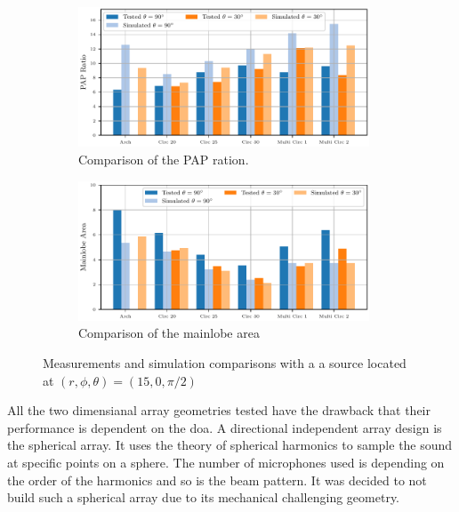 \begin{figure}[]
	\centering
	\begin{subfigure}[b]{1\textwidth}
		\centering
		\includegraphics[width=0.95\textwidth]{images/5_array_evaluation/PapTestSim.pdf}
		\caption{Comparison of the PAP ration.}
		\label{fig:comp1}
	\end{subfigure}
	\begin{subfigure}[b]{1\textwidth}
		\centering
		\includegraphics[width=0.95\textwidth]{images/5_array_evaluation/AreaTestSim.pdf}
		\caption{Comparison of the mainlobe area}
		\label{fig:comp2}
	\end{subfigure}
	\caption{Measurements and simulation comparisons with a a source located at $(r, \phi, \theta) = (15, 0, \pi/2)$}
	\label{fig:TestSim}
\end{figure}

All the two dimensianal array geometries tested have the drawback
that their performance is dependent on the \acrshort*{doa}.
A directional independent array design is the spherical array. \cite{keylist}
It uses the theory of spherical harmonics to sample the sound at specific points
on a sphere.
The number of microphones used is depending on the order of the harmonics and so 
is the beam pattern.
It was decided to not build such a spherical array due to its mechanical 
challenging geometry.


